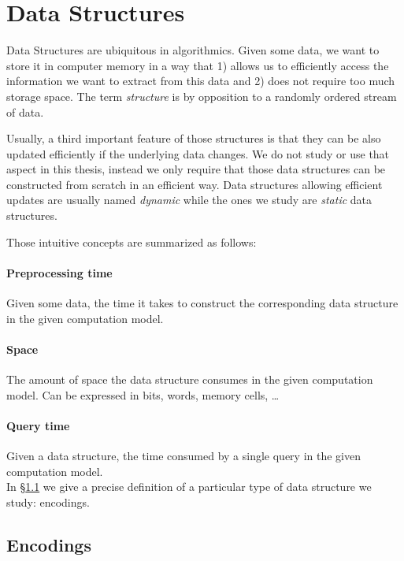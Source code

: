 \section{Data Structures}%

Data Structures are ubiquitous in algorithmics. Given some data, we want to
store it in computer memory in a way that 1) allows us to efficiently access
the information we want to extract from this data and 2) does not require too
much storage space. The term \emph{structure} is by opposition to a randomly
ordered stream of data.

Usually, a third important feature of those structures is that they can be also
updated efficiently if the underlying data changes. We do not study or use that
aspect in this thesis, instead we only require that those data structures can
be constructed from scratch in an efficient way. Data
structures allowing efficient updates are usually named \emph{dynamic}
while the ones we study are \emph{static} data structures.

Those intuitive concepts are summarized as follows:

\paragraph{Preprocessing time} Given some data, the time it takes to construct
the corresponding data structure in the given computation model.

\paragraph{Space} The amount of space the data structure consumes in the given
computation model. Can be expressed in bits, words, memory cells, \dots

\paragraph{Query time} Given a data structure, the time consumed by a
single query in the given computation model.
\\

In \S\ref{sec:models-of-computation:data-structures:encodings} we give a precise
definition of a particular type of data structure we study: encodings.

\subsection{Encodings}%
\label{sec:models-of-computation:data-structures:encodings}

